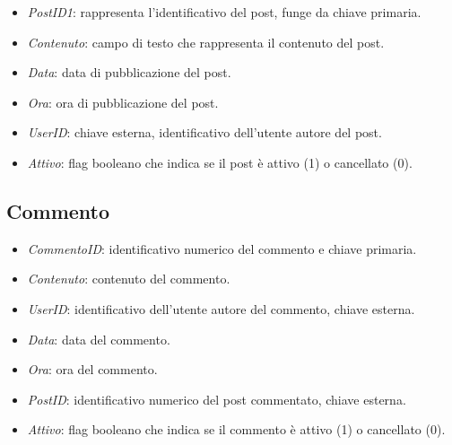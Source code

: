 \documentclass[paper=a4, fontsize=11pt,x11names]{report}
\newcommand{\key}[1]{\underline{#1}}
\begin{document}
\begin{itemize}
\item \textit{PostID1}: rappresenta l'identificativo del post, funge da chiave primaria.
\item \textit{Contenuto}: campo di testo che rappresenta il contenuto del post.
\item \textit{Data}: data di pubblicazione del post.
\item \textit{Ora}: ora di pubblicazione del post.
\item \textit{UserID}: chiave esterna, identificativo dell'utente autore del post.
\item \textit{Attivo}: flag booleano che indica se il post è attivo (1) o cancellato (0).
\end{itemize}

\subsection{Commento}
\centering
\vspace{0.5cm}
\vspace{0.5cm}

\begin{itemize}
\item \textit{CommentoID}: identificativo numerico del commento e chiave primaria.
\item \textit{Contenuto}: contenuto del commento.
\item \textit{UserID}: identificativo dell'utente autore del commento, chiave esterna.
\item \textit{Data}: data del commento.
\item \textit{Ora}: ora del commento.
\item \textit{PostID}: identificativo numerico del post commentato, chiave esterna.
\item \textit{Attivo}: flag booleano che indica se il commento è attivo (1) o cancellato (0).
\end{itemize}
\end{document}
